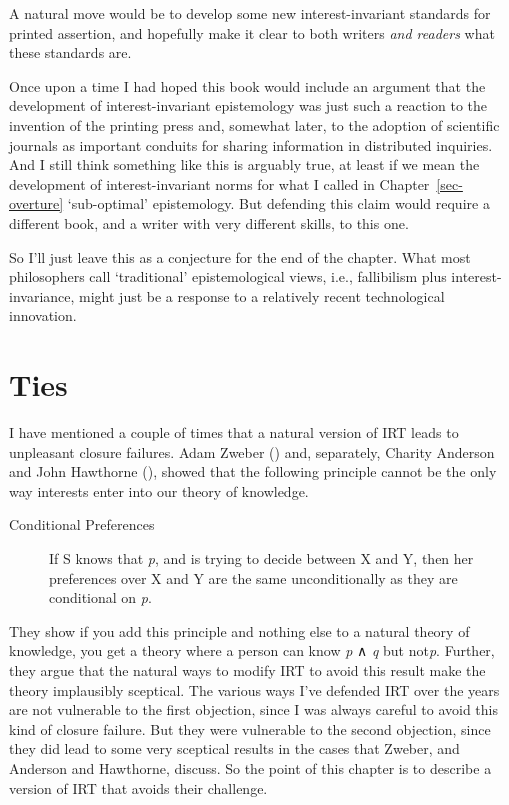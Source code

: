 \documentclass[
  12pt,
  letterpaper,
]{scrbook}
\begin{document}
A natural move would be to develop some new interest-invariant standards
for printed assertion, and hopefully make it clear to both writers
\emph{and readers} what these standards are.

Once upon a time I had hoped this book would include an argument that
the development of interest-invariant epistemology was just such a
reaction to the invention of the printing press and, somewhat later, to
the adoption of scientific journals as important conduits for sharing
information in distributed inquiries. And I still think something like
this is arguably true, at least if we mean the development of
interest-invariant norms for what I called in Chapter~\ref{sec-overture}
`sub-optimal' epistemology. But defending this claim would require a
different book, and a writer with very different skills, to this one.

So I'll just leave this as a conjecture for the end of the chapter. What
most philosophers call `traditional' epistemological views, i.e.,
fallibilism plus interest-invariance, might just be a response to a
relatively recent technological innovation.


\chapter{Ties}\label{sec-ties}

I have mentioned a couple of times that a natural version of IRT leads
to unpleasant closure failures. Adam Zweber
() and, separately, Charity Anderson and
John Hawthorne (), showed
that the following principle cannot be the only way interests enter into
our theory of knowledge.

\begin{description}
\item[Conditional Preferences]
If S knows that \emph{p}, and is trying to decide between X and Y, then
her preferences over X and Y are the same unconditionally as they are
conditional on \emph{p}.
\end{description}

They show if you add this principle and nothing else to a natural theory
of knowledge, you get a theory where a person can know \emph{p} ∧
\emph{q} but not\emph{p}. Further, they argue that the natural ways to
modify IRT to avoid this result make the theory implausibly sceptical.
The various ways I've defended IRT over the years are not vulnerable to
the first objection, since I was always careful to avoid this kind of
closure failure. But they were vulnerable to the second objection, since
they did lead to some very sceptical results in the cases that Zweber,
and Anderson and Hawthorne, discuss. So the point of this chapter is to
describe a version of IRT that avoids their challenge.
\end{document}
